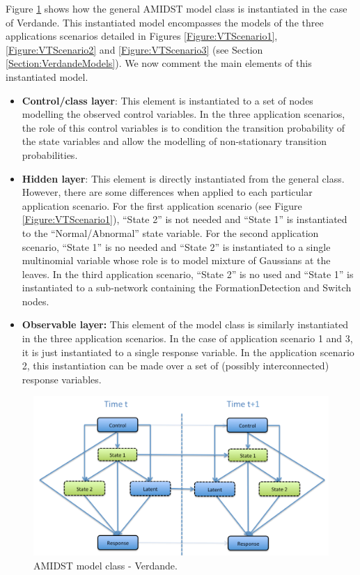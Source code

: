 Figure \ref{Figure:AMIDSTModelClassVerdande} shows how the general AMIDST model class is instantiated in the case of Verdande. This instantiated model encompasses the models of the three applications scenarios detailed in Figures \ref{Figure:VTScenario1}, \ref{Figure:VTScenario2} and \ref{Figure:VTScenario3}  (see Section \ref{Section:VerdandeModels}).  We now comment the main elements of this instantiated model.


\begin{itemize}
\item \textbf{Control/class layer}:  This element is instantiated to a set of nodes modelling the observed control variables. In the three application scenarios, the role of this control variables is to condition the transition probability of the state variables and allow the modelling of non-stationary transition probabilities.  

\item \textbf{Hidden layer}: This element is directly instantiated from the general class. However, there are some differences when applied to each particular application scenario. For the first application scenario (see Figure \ref{Figure:VTScenario1}),  ``State 2'' is not needed and ``State 1'' is instantiated to the ``Normal/Abnormal'' state variable. For the second application scenario, ``State 1'' is no needed and ``State 2'' is instantiated to a single multinomial variable whose role is to model mixture of Gaussians at the leaves. In the third application scenario, ``State 2'' is no used and ``State 1'' is instantiated to a sub-network containing the FormationDetection and Switch nodes. 

\item \textbf{Observable layer: } This element of the model class is similarly instantiated in the three application scenarios. In the case of application scenario 1 and 3, it is just instantiated to a single response variable. In the application scenario 2, this instantiation can be made over a set of (possibly interconnected) response variables. 
\end{itemize}



\begin{figure}[ht!]
\begin{center}
\includegraphics[scale=0.39]{./figures/AMIDSTModelClassVerdande}
\caption{\label{Figure:AMIDSTModelClassVerdande} AMIDST model class - Verdande.}
\end{center}
\end{figure}


